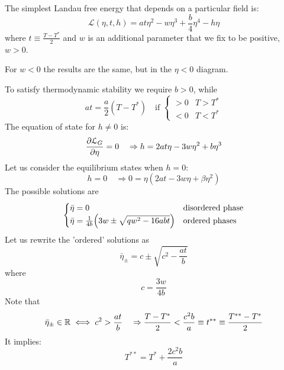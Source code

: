 \documentclass[../main/main.tex]{subfiles}
\begin{document}
The simplest Landau free energy that depends on a particular field is:
\begin{equation}
  \mathcal{L} ( \eta ,t,h)= a t \eta ^2 - w \eta ^3 + \frac{b}{4} \eta ^4 - h \eta
\end{equation}
where \( t \equiv \frac{T-T^*}{2} \) and \( w \) is an additional parameter that we fix to be positive, \( w>0 \).
\begin{remark}
For \( w<0 \) the results are the same, but in the \( \eta <0 \) diagram.
\end{remark}
To satisfy thermodynamic stability we require \( b>0 \), while
\begin{equation}
  a t = \frac{a}{2} ( T - T^*) \quad \text{if } \begin{cases}
    > 0 & T > T^* \\
    <0 & T < T^*
\end{cases}
\end{equation}
The equation of state for \( h \neq 0 \) is:
\begin{equation}
  \pdv{\mathcal{L}_G}{\eta } = 0 \quad \Rightarrow h = 2 a t \eta - 3 w \eta ^2 + b \eta ^3
\end{equation}
Let us consider the equilibrium states when \( h=0 \):
\begin{equation}
  h = 0 \quad \Rightarrow 0 = \eta ( 2 a t - 3 w \eta  + \beta \eta ^2)
\end{equation}
 The possible solutions are
\begin{equation}
  \begin{cases}
   \bar{\eta } = 0 & \text{disordered phase}\\
  \bar{\eta } = \frac{1}{4b} \qty(3w \pm \sqrt{q w^2 - 16 abt} ) & \text{ordered phases}
  \end{cases}
\end{equation}
Let us rewrite the 'ordered' solutions as
\begin{equation}
  \bar{\eta }_{\pm} = c \pm \sqrt{c^2 - \frac{at}{b}}
\end{equation}
where
\begin{equation}
  c = \frac{3w}{4b}
\end{equation}
Note that
\begin{equation}
  \bar{\eta }_{\pm} \in \mathbb{R} \iff c^2 > \frac{at}{b} \quad \Rightarrow \frac{T-T^*}{2} < \frac{c^2 b}{a} \equiv t^{**} \equiv  \frac{T^{**}-T^*}{2}
\end{equation}
It implies:
\begin{equation}
  T^{**} = T^* + \frac{2c^2b}{a}
\end{equation}
\end{document}
